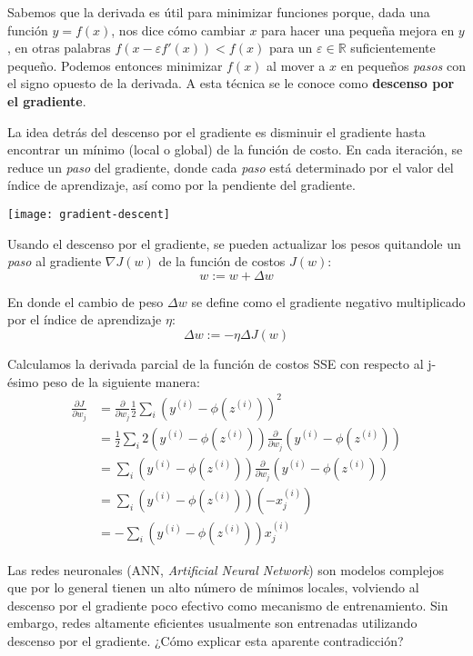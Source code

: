 Sabemos que la derivada es útil para minimizar funciones porque, dada
una función $y = f(x)$, nos dice cómo cambiar $x$ para hacer una
pequeña mejora en $y$, en otras palabras $f(x-\varepsilon f'(x)) <
f(x)$ para un $\varepsilon \in \mathbb{R}$ suficientemente
pequeño. Podemos entonces minimizar $f(x)$ al mover a $x$ en pequeños
\textit{pasos} con el signo opuesto de la derivada. A esta técnica se
le conoce como \textbf{descenso por el gradiente}.

La idea detrás del descenso por el gradiente es disminuir el gradiente hasta encontrar
un mínimo (local o global) de la función de costo. En cada iteración, se reduce
un \textit{paso} del gradiente, donde cada \textit{paso} está determinado por
el valor del índice de aprendizaje, así como por la pendiente del gradiente.

\texttt{[image: gradient-descent]}

Usando el descenso por el gradiente, se pueden actualizar los pesos quitandole un \textit{paso}
al gradiente $\nabla J(w)$ de la función de costos $J(w)$:
\begin{equation}
  w := w + \Delta w
\end{equation}

En donde el cambio de peso $\Delta w$ se define como el gradiente negativo multiplicado
por el índice de aprendizaje $\eta$:
\begin{equation}
  \Delta w := -\eta \Delta J(w)
\end{equation}

Calculamos la derivada parcial de la función de costos SSE con respecto al
j-ésimo peso de la siguiente manera:
\begin{equation*}
\begin{split}
  \frac{\partial J}{\partial w_j} &= \frac{\partial}{\partial w_j}\frac{1}{2}\sum_i (y^{(i)} - \phi(z^{(i)}))^2 \\
  &= \frac{1}{2}\sum_i 2(y^{(i)} - \phi(z^{(i)}))\frac{\partial}{\partial w_j}(y^{(i)} - \phi(z^{(i)}))\\
  &= \sum_i (y^{(i)} - \phi(z^{(i)}))\frac{\partial}{\partial w_j}(y^{(i)} - \phi (z^{(i)}))\\
  &= \sum_i(y^{(i)} - \phi(z^{(i)}))(-x_j^{(i)})\\
  &= -\sum_i(y^{(i)} - \phi(z^{(i)}))x_j^{(i)}
\end{split}
\end{equation*}

Las redes neuronales (ANN, \textit{Artificial Neural Network}) son
modelos complejos que por lo general tienen un alto número de mínimos
locales, volviendo al descenso por el gradiente poco efectivo como
mecanismo de entrenamiento.  Sin embargo, redes altamente eficientes
usualmente son entrenadas utilizando descenso por el gradiente. ¿Cómo
explicar esta aparente contradicción?

